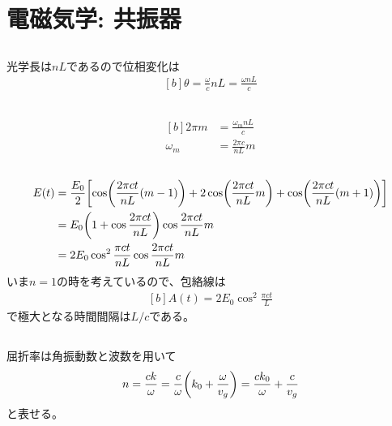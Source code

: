 \documentclass[../ap_2010.tex]{subfiles}
\begin{document}
\chapter{電磁気学: 共振器}
\section{}
光学長は\(nL\)であるので位相変化は
\begin{equation}\begin{aligned}[b]
    \theta = \frac{\omega}{c}nL = \frac{\omega nL}{c}
\end{aligned}\end{equation}
\section{}
\begin{equation}\begin{aligned}[b]
    2\pi m &= \frac{\omega_m nL}{c}\\
    \omega_m &= \frac{2\pi c}{nL} m
\end{aligned}\end{equation}

\section{}
\begin{equation}\begin{aligned}[b]
    E(t) &= \frac{E_0}{2}\qty[\cos(\frac{2\pi ct}{nL}(m-1))+2\cos(\frac{2\pi ct}{nL}m)+\cos(\frac{2\pi ct}{nL}(m+1))]\\
    &= E_0\qty(1+\cos\frac{2\pi ct}{nL})\cos\frac{2\pi ct}{nL}m\\
    &= 2E_0\cos^2\frac{\pi ct}{nL} \cos\frac{2\pi ct}{nL}m
\end{aligned}\end{equation}
いま\(n=1\)の時を考えているので、包絡線は
\begin{equation}\begin{aligned}[b]
    A(t) = 2E_0\cos^2\frac{\pi ct}{L}
\end{aligned}\end{equation}
で極大となる時間間隔は\(L/c\)である。

\section{}
屈折率は角振動数と波数を用いて
\begin{equation}\begin{aligned}[b]
    n = \frac{ck}{\omega} = \frac{c}{\omega}\qty(k_0+\frac{\omega}{v_g}) = \frac{ck_0}{\omega}+\frac{c}{v_g}
\end{aligned}\end{equation}
と表せる。
\end{document}
